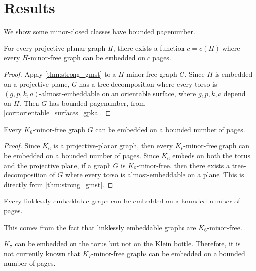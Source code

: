 \section{Results}
We show some minor-closed classes have bounded pagenumber.

\begin{proposition}
	For every projective-planar graph $H$, there exists a function $c = c(H)$ where every $H$-minor-free graph can be embedded on $c$ pages. 
\end{proposition}
\begin{proof}
	Apply \cref{thm:strong_gmst} to a $H$-minor-free graph $G$. Since $H$ is embedded on a projective-plane, $G$ has a tree-decomposition where every torso is $(g,p,k,a)$-almost-embeddable on an orientable surface, where $g, p, k,a$ depend on $H$. Then $G$ has bounded pagenumber, from \cref{corr:orientable_surfaces_gpka}.
\end{proof}

\begin{corollary}\label{corr:k6_minor_pn}
	Every $K_6$-minor-free graph $G$ can be embedded on a bounded number of pages.
\end{corollary}

\begin{proof}
	Since $K_6$ is a projective-planar graph, then every $K_6$-minor-free graph can be embedded on a bounded number of pages. Since $K_6$ embeds on both the torus and the projective plane, if a graph $G$ is $K_6$-minor-free, then there exists a tree-decomposition of $G$ where every torso is almost-embeddable on a plane. This is directly from \cref{thm:strong_gmst}. 
\end{proof}
\begin{corollary}
    Every linklessly embeddable graph can be embedded on a bounded number of pages.
\end{corollary}
This comes from the fact that linklessly embeddable graphs are $K_6$-minor-free.

$K_7$ can be embedded on the torus but not on the Klein bottle. Therefore, it is not currently known that $K_7$-minor-free graphs can be embedded on a bounded number of pages. 

